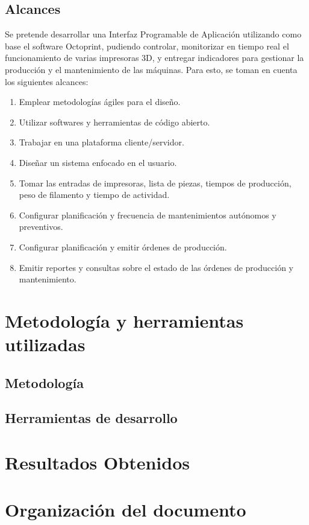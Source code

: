 \subsection{Alcances}

Se pretende desarrollar una Interfaz Programable de Aplicación utilizando como base el software Octoprint, pudiendo controlar, monitorizar en tiempo real el funcionamiento de varias impresoras 3D, y entregar indicadores para gestionar la producción y el mantenimiento de las máquinas. Para esto, se toman en cuenta los siguientes alcances:

\begin{enumerate}
	\item Emplear metodologías ágiles para el diseño.
	\item Utilizar softwares y herramientas de código abierto.
	\item Trabajar en una plataforma cliente/servidor.
	\item Diseñar un sistema enfocado en el usuario.
	\item Tomar las entradas de impresoras, lista de piezas, tiempos de producción, peso de filamento y tiempo de actividad. 
	\item Configurar planificación y frecuencia de mantenimientos autónomos y preventivos.
	\item Configurar planificación y emitir órdenes de producción.
	\item Emitir reportes y consultas sobre el estado de las órdenes de producción y mantenimiento. 


\end{enumerate}  

\section{Metodolog\'ia y herramientas utilizadas}
\label{intro:metodologia}

\subsection{Metodolog\'ia}


\subsection{Herramientas de desarrollo}


\section{Resultados Obtenidos}
\label{intro:resultados}


\section{Organizaci\'on del documento}
\label{intro:organizacion}


